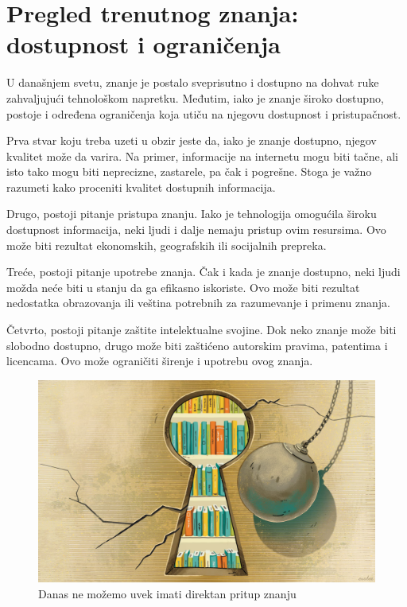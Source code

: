 \documentclass{article}
\begin{document}
\section{Pregled trenutnog znanja: dostupnost i ograničenja}

U današnjem svetu, znanje je postalo sveprisutno i dostupno na dohvat ruke zahvaljujući tehnološkom napretku. Međutim, iako je znanje široko dostupno, postoje i određena ograničenja koja utiču na njegovu dostupnost i pristupačnost.

Prva stvar koju treba uzeti u obzir jeste da, iako je znanje dostupno, njegov kvalitet može da varira. Na primer, informacije na internetu mogu biti tačne, ali isto tako mogu biti neprecizne, zastarele, pa čak i pogrešne. Stoga je važno razumeti kako proceniti kvalitet dostupnih informacija.

Drugo, postoji pitanje pristupa znanju. Iako je tehnologija omogućila široku dostupnost informacija, neki ljudi i dalje nemaju pristup ovim resursima. Ovo može biti rezultat ekonomskih, geografskih ili socijalnih prepreka.

Treće, postoji pitanje upotrebe znanja. Čak i kada je znanje dostupno, neki ljudi možda neće biti u stanju da ga efikasno iskoriste. Ovo može biti rezultat nedostatka obrazovanja ili veština potrebnih za razumevanje i primenu znanja.

Četvrto, postoji pitanje zaštite intelektualne svojine. Dok neko znanje može biti slobodno dostupno, drugo može biti zaštićeno autorskim pravima, patentima i licencama. Ovo može ograničiti širenje i upotrebu ovog znanja.

\begin{figure}[htbp]
    \center
    \includegraphics[scale=0.2]{img/lock.png}
    \caption{Danas ne možemo uvek imati direktan pritup znanju}
\end{figure}
\end{document}
